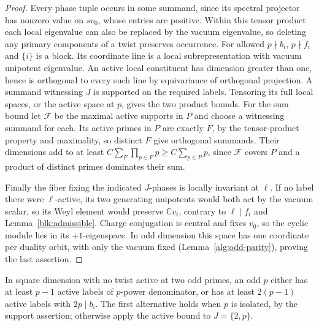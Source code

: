 \documentclass[11pt]{amsart}
\numberwithin{equation}{section}
\theoremstyle{definition}
\theoremstyle{plain}
\begin{document}
\begin{proof}
Every phase tuple occurs in some summand, since its spectral projector
has nonzero value on $sv_0$, whose entries are positive. Within this
tensor product each local eigenvalue can also be replaced by the
vacuum eigenvalue, so deleting any primary components of a twist
preserves occurrence. For allowed $p\nmid b_i$, $p\nmid f_i$ and
$\{i\}$ is a block. Its coordinate line is a local subrepresentation
with vacuum unipotent eigenvalue. An active local constituent has
dimension greater than one, hence is orthogonal to every such line
by equivariance of orthogonal projection. A summand witnessing $J$
is supported on the required labels. Tensoring its full local spaces,
or the active space at $p$, gives the two product bounds.
For the sum bound let $\mathcal F$ be the maximal active supports
in $P$ and choose a witnessing summand for each. Its active primes
in $P$ are exactly $F$, by the tensor-product property and maximality,
so distinct $F$ give orthogonal summands. Their dimensions add to at
least $C\sum_F\prod_{p\in F}p\ge C\sum_{p\in P}p$, since
$\mathcal F$ covers $P$ and a product of distinct primes dominates
their sum.

Finally the fiber fixing the indicated $J$-phases is locally invariant
at $\ell$. If no label there were $\ell$-active, its two generating
unipotents would both act by the vacuum scalar, so its Weyl element
would preserve $\mathbb C v_i$, contrary to $\ell\mid f_i$ and
Lemma~\ref{blk:admissible}.
Charge conjugation is central and fixes $v_0$, so the cyclic module
lies in its $+1$-eigenspace. In odd dimension this space has one
coordinate per duality orbit, with only the vacuum fixed
(Lemma~\ref{alg:odd-parity}), proving the last assertion.
\end{proof}

In square dimension with no twist active at two odd primes, an odd
$p$ either has at least $p-1$ active labels of $p$-power denominator,
or has at least $2(p-1)$ active labels with $2p\mid b_i$.
The first alternative holds when $p$ is isolated, by the support
assertion; otherwise apply the active bound to $J=\{2,p\}$.
\end{document}
